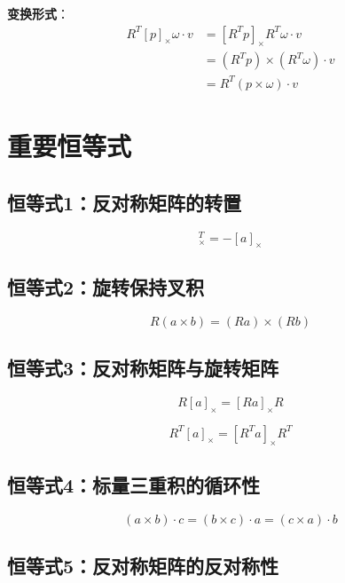 \documentclass[12pt,a4paper]{article}
\begin{document}
\textbf{变换形式}：
\begin{align}
R^T [p]_{\times} \omega \cdot v &= [R^T p]_{\times} R^T \omega \cdot v \\
&= (R^T p) \times (R^T \omega) \cdot v \\
&= R^T (p \times \omega) \cdot v
\end{align}

\section{重要恒等式}

\subsection{恒等式1：反对称矩阵的转置}

\begin{equation}
[a]_{\times}^T = -[a]_{\times}
\end{equation}

\subsection{恒等式2：旋转保持叉积}

\begin{equation}
R(a \times b) = (Ra) \times (Rb)
\end{equation}

\subsection{恒等式3：反对称矩阵与旋转矩阵}

\begin{equation}
R [a]_{\times} = [Ra]_{\times} R
\end{equation}

\begin{equation}
R^T [a]_{\times} = [R^T a]_{\times} R^T
\end{equation}

\subsection{恒等式4：标量三重积的循环性}

\begin{equation}
(a \times b) \cdot c = (b \times c) \cdot a = (c \times a) \cdot b
\end{equation}

\subsection{恒等式5：反对称矩阵的反对称性}
\end{document}

